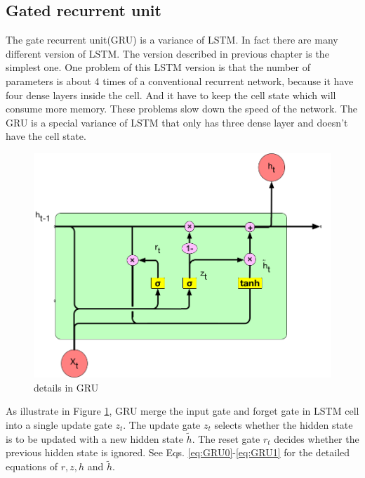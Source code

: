 \par


\subsection{Gated recurrent unit}
\par
The gate recurrent unit(GRU)\cite{cho2014learning} is a variance of LSTM. In fact there are many different version of LSTM. The version described in previous chapter is the simplest one. One problem of this LSTM version is that the number of parameters is about 4 times of a conventional recurrent network, because it have four dense layers inside the cell. And it have to keep the cell state which will consume more memory. These problems slow down the speed of the network. The GRU is a special variance of LSTM that only has three dense layer and doesn't have the cell state.\par

\begin{figure}[h] 
	\centering
	\includegraphics[width=6.0in]{Figures/recurrent5}
	\caption[details in GRU]{details in GRU}
	\label{fig:4}
\end{figure}

As illustrate in Figure \ref{fig:4}, GRU merge the input gate and forget gate in LSTM cell into a single update gate $z_t$. The update gate $z_t$ selects whether the hidden state is to be updated with
a new hidden state $\tilde{h}$. The reset gate $r_t$ decides whether the previous hidden state is ignored. See Eqs. \ref{eq:GRU0}-\ref{eq:GRU1} for the detailed equations of $r, z, h$ and $\tilde{h}$.

